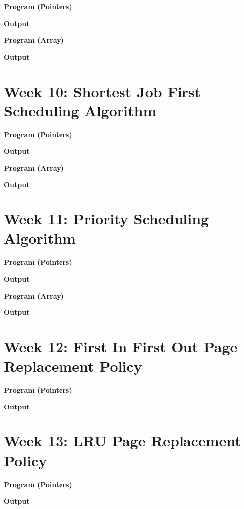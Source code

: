 \documentclass{article}
\begin{document}
\noindent \textbf{\large{Program (Pointers)}}


\noindent \textbf{\large{Output}}


\noindent \textbf{\large{Program (Array)}}


\noindent \textbf{\large{Output}}


\newpage
\section{Week 10: Shortest Job First Scheduling Algorithm}

\noindent \textbf{\large{Program (Pointers)}}


\noindent \textbf{\large{Output}}


\noindent \textbf{\large{Program (Array)}}


\noindent \textbf{\large{Output}}


\newpage
\section{Week 11: Priority Scheduling Algorithm}

\noindent \textbf{\large{Program (Pointers)}}


\noindent \textbf{\large{Output}}


\noindent \textbf{\large{Program (Array)}}


\noindent \textbf{\large{Output}}


\newpage
\section{Week 12: First In First Out Page Replacement Policy}

\noindent \textbf{\large{Program (Pointers)}}


\noindent \textbf{\large{Output}}


\newpage
\section{Week 13: LRU Page Replacement Policy}

\noindent \textbf{\large{Program (Pointers)}}


\noindent \textbf{\large{Output}}

\end{document}
